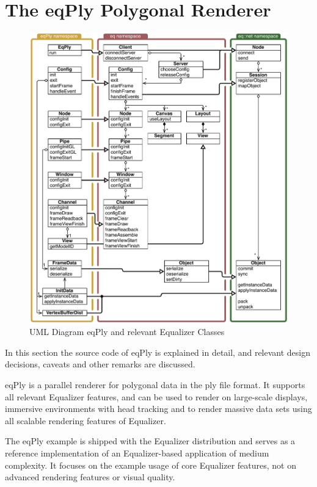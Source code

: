 \documentclass[10pt,a4]{scrartcl}
\begin{document}
\section{\label{sEqPly}The eqPly Polygonal Renderer}

\begin{figure}[ht!]\center
  \includegraphics[width=.9\textwidth]{images/uml}
  {\caption{\label{fUml}UML Diagram eqPly and relevant Equalizer Classes}}
\end{figure}

In this section the source code of \textsf{eqPly} is explained in
detail, and relevant design decisions, caveats and other remarks are
discussed.

\textsf{eqPly} is a parallel renderer for polygonal data in the
\textsf{ply} file format. It supports all relevant Equalizer features,
and can be used to render on large-scale displays, immersive
environments with head tracking and to render massive data sets using
all scalable rendering features of Equalizer.

The \textsf{eqPly} example is shipped with the Equalizer distribution
and serves as a reference implementation of an Equalizer-based
application of medium complexity. It focuses on the example usage of
core Equalizer features, not on advanced rendering features or visual
quality.
\end{document}
